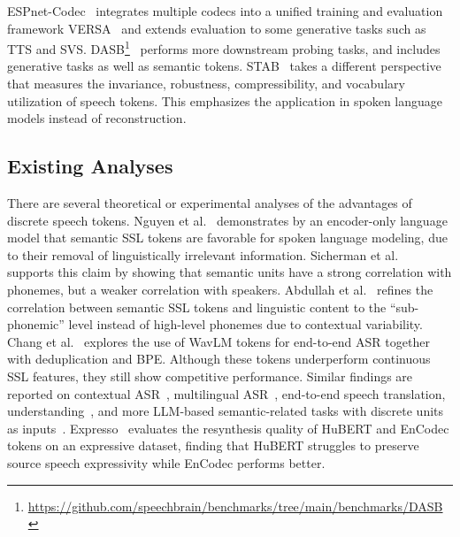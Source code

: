 ESPnet-Codec~\cite{shi2024espnet} integrates multiple codecs into a unified training and evaluation framework VERSA~\cite{shi2024versa} and extends evaluation to some generative tasks such as TTS and SVS.
DASB\footnote{\scriptsize\url{https://github.com/speechbrain/benchmarks/tree/main/benchmarks/DASB}}~\cite{mousavi2024dasb} performs more downstream probing tasks, and includes generative tasks as well as semantic tokens.
STAB~\cite{vashishth2024stab} takes a different perspective that measures the invariance, robustness, compressibility, and vocabulary utilization of speech tokens. 
This emphasizes the application in spoken language models instead of reconstruction.


\subsection{Existing Analyses}

There are several theoretical or experimental analyses of the advantages of discrete speech tokens.
Nguyen et al.~\cite{nguyen2022discrete} demonstrates by an encoder-only language model that semantic SSL tokens are favorable for spoken language modeling, due to their removal of linguistically irrelevant information.
Sicherman et al.~\cite{sicherman2023analysing} supports this claim by showing that semantic units have a strong correlation with phonemes, but a weaker correlation with speakers.
Abdullah et al.~\cite{abdullah23_interspeech} refines the correlation between semantic SSL tokens and linguistic content to the ``sub-phonemic'' level instead of high-level phonemes due to contextual variability.
Chang et al.~\cite{chang23b_interspeech} explores the use of WavLM tokens for end-to-end ASR together with deduplication and BPE. Although these tokens underperform continuous SSL features, they still show competitive performance. 
Similar findings are reported on contextual ASR~\cite{cui2024exploring_context}, multilingual ASR~\cite{cui2024exploring}, end-to-end speech translation, 
understanding~\cite{chang2024exploring}, and more LLM-based semantic-related tasks with discrete units as inputs~\cite{wang2024comparative}.
Expresso~\cite{expresso}  evaluates the resynthesis quality of HuBERT and EnCodec tokens on an expressive dataset, finding that HuBERT struggles to preserve source speech expressivity while EnCodec performs better.

